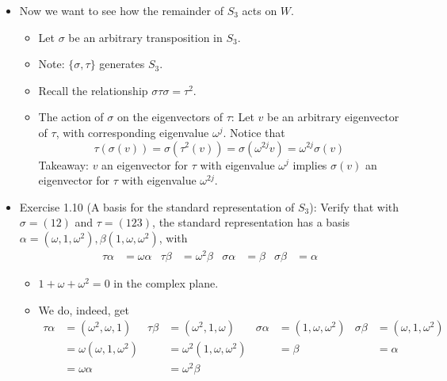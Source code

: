 \documentclass[../notes.tex]{subfiles}
\begin{document}
\begin{itemize}
\begin{itemize}
        \item Now we want to see how the remainder of $S_3$ acts on $W$.
        \begin{itemize}
            \item Let $\sigma$ be an arbitrary transposition in $S_3$.
            \item Note: $\{\sigma,\tau\}$ generates $S_3$.
            \item Recall the relationship $\sigma\tau\sigma=\tau^2$.
            \item The action of $\sigma$ on the eigenvectors of $\tau$: Let $v$ be an arbitrary eigenvector of $\tau$, with corresponding eigenvalue $\omega^j$. Notice that
            \begin{equation*}
                \tau(\sigma(v)) = \sigma(\tau^2(v))
                = \sigma(\omega^{2j}v)
                = \omega^{2j}\sigma(v)
            \end{equation*}
            Takeaway: $v$ an eigenvector for $\tau$ with eigenvalue $\omega^j$ implies $\sigma(v)$ an eigenvector for $\tau$ with eigenvalue $\omega^{2j}$.
        \end{itemize}
        \item Exercise 1.10 (A basis for the standard representation of $S_3$): Verify that with $\sigma=(12)$ and $\tau=(123)$, the standard representation has a basis $\alpha=(\omega,1,\omega^2),\beta(1,\omega,\omega^2)$, with
        \begin{align*}
            \tau\alpha &= \omega\alpha&
            \tau\beta &= \omega^2\beta&
            \sigma\alpha &= \beta&
            \sigma\beta &= \alpha
        \end{align*}
        \begin{itemize}
            \item $1+\omega+\omega^2=0$ in the complex plane.
            \item We do, indeed, get
            \begin{align*}
                \tau\alpha &= (\omega^2,\omega,1)&
                    \tau\beta &= (\omega^2,1,\omega)&
                        \sigma\alpha &= (1,\omega,\omega^2)&
                            \sigma\beta &= (\omega,1,\omega^2)\\
                &= \omega(\omega,1,\omega^2)&
                    &= \omega^2(1,\omega,\omega^2)&
                        &= \beta&
                            &= \alpha\\
                &= \omega\alpha&
                    &= \omega^2\beta

\end{align*}
\end{itemize}
\end{itemize}
\end{itemize}
\end{document}
